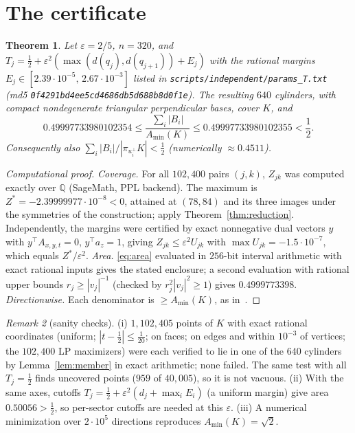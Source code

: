 \documentclass[11pt]{amsart}
\newtheorem{theorem}{Theorem}
\theoremstyle{remark}
\newtheorem{remark}[theorem]{Remark}
\newcommand{\eps}{\varepsilon}
\begin{document}
\section{The certificate}
\begin{theorem}\label{thm:main}
Let $\eps=2/5$, $n=320$, and $T_j=\frac12+\eps^2(\max(d(q_j),d(q_{j+1}))+E_j)$ with the rational
margins $E_j\in[2.39\cdot10^{-5},\,2.67\cdot10^{-3}]$ listed in \texttt{scripts/independent/params\_T.txt}
(md5 \texttt{0f4291bd4ee5cd4686db5d688b8d0f1e}). The resulting $640$ cylinders, with compact
nondegenerate triangular perpendicular bases, cover $K$, and
\[
0.49997733980102354\le\frac{\sum_i|B_i|}{A_{\min}(K)}\le0.49997733980102355<\frac12 .
\]
Consequently also $\sum_i|B_i|/|\pi_{u_i^\perp}K|<\frac12$ (numerically $\approx0.4511$).
\end{theorem}
\begin{proof}[Computational proof]
\emph{Coverage.} For all $102{,}400$ pairs $(j,k)$, $Z_{jk}$ was computed exactly over $\mathbb Q$
(SageMath, PPL backend). The maximum is
$Z^\ast=-2.39999977\cdot10^{-8}<0$, attained at $(78,84)$ and its three images under the symmetries of
the construction; apply Theorem~\ref{thm:reduction}. Independently, the margins were certified by
exact nonnegative dual vectors $y$ with $y^\top A_{x,y,t}=0$, $y^\top a_z=1$, giving
$Z_{jk}\le\varepsilon^2 U_{jk}$ with $\max U_{jk}=-1.5\cdot10^{-7}$, which equals $Z^\ast/\eps^2$.
\emph{Area.} \eqref{eq:area} evaluated in $256$-bit interval arithmetic with exact rational inputs
gives the stated enclosure; a second evaluation with rational upper bounds $r_j\ge|v_j|^{-1}$
(checked by $r_j^2|v_j|^2\ge1$) gives $0.4999773398$.
\emph{Directionwise.} Each denominator is $\ge A_{\min}(K)$, as in~\cite[eq.~\texttt{cost-comparison}]{OAI100}.
\end{proof}

\begin{remark}[sanity checks]
(i) $1{,}102{,}405$ points of $K$ with exact rational coordinates (uniform; $|t-\frac12|\le\frac1{20}$;
on faces; on edges and within $10^{-3}$ of vertices; the $102{,}400$ LP maximizers) were each verified
to lie in one of the 640 cylinders by Lemma~\ref{lem:member} in exact arithmetic; none failed.
The same test with all $T_j=\frac12$ finds uncovered points ($959$ of $40{,}005$), so it is not vacuous.
(ii) With the same axes, cutoffs $T_j=\frac12+\eps^2(d_j+\max_iE_i)$ (a uniform margin) give
area $0.50056>\frac12$, so per-sector cutoffs are needed at this $\eps$.
(iii) A numerical minimization over $2\cdot10^5$ directions reproduces $A_{\min}(K)=\sqrt2$.
\end{remark}
\end{document}
